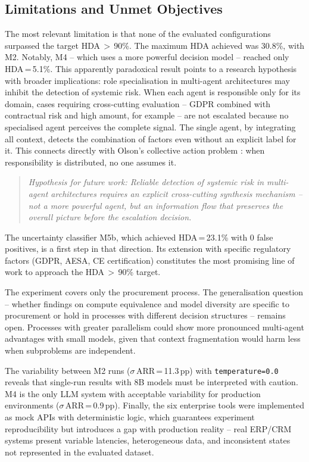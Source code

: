 \documentclass[preprint,12pt,authoryear]{elsarticle}
\begin{document}
\subsection{Limitations and Unmet Objectives}

The most relevant limitation is that none of the evaluated configurations
surpassed the target HDA\,$>$\,90\%.
The maximum HDA achieved was 30.8\%, with M2.
Notably, M4 -- which uses a more powerful decision model -- reached only
HDA\,=\,5.1\%.
This apparently paradoxical result points to a research hypothesis with broader
implications: role specialisation in multi-agent architectures may inhibit the
detection of systemic risk.
When each agent is responsible only for its domain, cases requiring
cross-cutting evaluation -- GDPR combined with contractual risk and high amount,
for example -- are not escalated because no specialised agent perceives the
complete signal.
The single agent, by integrating all context, detects the combination of
factors even without an explicit label for it.
This connects directly with Olson's collective action problem
\citeyearpar{olson1965}: when responsibility is distributed, no one assumes it.

\begin{quote}
\textit{Hypothesis for future work: Reliable detection of systemic risk in
multi-agent architectures requires an explicit cross-cutting synthesis mechanism
-- not a more powerful agent, but an information flow that preserves the overall
picture before the escalation decision.}
\end{quote}

The uncertainty classifier M5b, which achieved HDA\,=\,23.1\% with 0 false
positives, is a first step in that direction.
Its extension with specific regulatory factors (GDPR, AESA, CE certification)
constitutes the most promising line of work to approach the HDA\,$>$\,90\%
target.

The experiment covers only the procurement process.
The generalisation question -- whether findings on compute equivalence and model
diversity are specific to procurement or hold in processes with different
decision structures -- remains open.
Processes with greater parallelism could show more pronounced multi-agent
advantages with small models, given that context fragmentation would harm less
when subproblems are independent.

The variability between M2 runs ($\sigma$\,ARR\,=\,11.3\,pp) with
\texttt{temperature=0.0} reveals that single-run results with 8B models must be
interpreted with caution.
M4 is the only LLM system with acceptable variability for production
environments ($\sigma$\,ARR\,=\,0.9\,pp).
Finally, the six enterprise tools were implemented as mock APIs with
deterministic logic, which guarantees experiment reproducibility but introduces
a gap with production reality -- real ERP/CRM systems present variable
latencies, heterogeneous data, and inconsistent states not represented in the
evaluated dataset.
\end{document}
